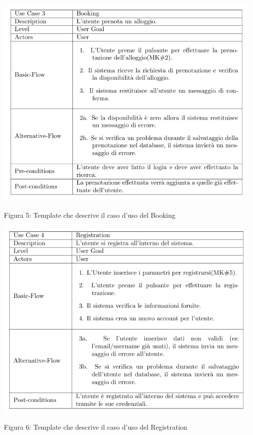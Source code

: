 \documentclass[10pt]{article}
\begin{document}
\begin{center}
\includegraphics[scale=0.6]{templates/tabella3}
\par\medskip
Figura 5: Template che descrive il caso d'uso del Booking
\par\medskip
\includegraphics[scale=0.6]{templates/tabella4}
\par\medskip
Figura 6: Template che descrive il caso d'uso del Registration
\par\medskip

\end{center}
\end{document}
